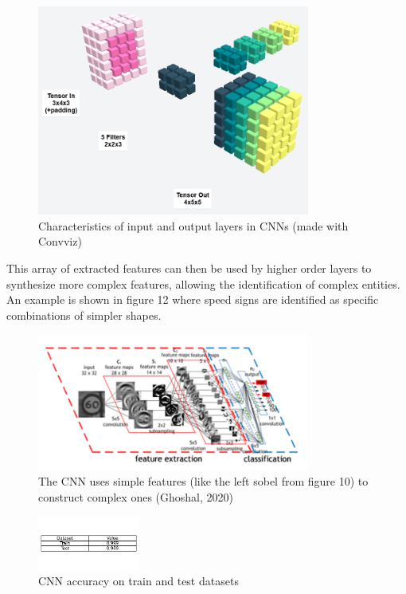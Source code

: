 \documentclass{article}
\begin{document}
\begin{figure}[h!]
    \centering
    \includegraphics[width=0.8\textwidth]{./plots/screenshot7.png}
    \caption{Characteristics of input and output layers in CNNs (made with Convviz)}
    \label{fig:plot11}
\end{figure}

This array of extracted features can then be used by higher order layers to synthesize more complex features, allowing the identification of complex entities.
An example is shown in figure 12 where speed signs are identified as specific combinations of simpler shapes.

\begin{figure}[h!]
    \centering
    \includegraphics[width=0.8\textwidth]{./plots/screenshot8.png}
    \caption{The CNN uses simple features (like the left sobel from figure 10) to construct complex ones (Ghoshal, 2020)}
    \label{fig:plot12}
\end{figure}

\begin{figure}[h!]
    \centering
    \includegraphics[width=0.3\textwidth]{./plots/plot12.png}
    \caption{CNN accuracy on train and test datasets}
    \label{fig:plot13}
\end{figure}
\end{document}
